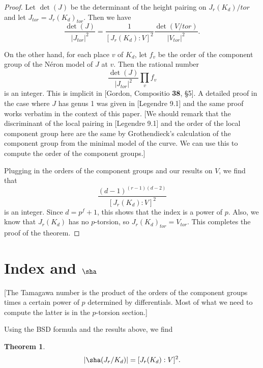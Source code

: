 \documentclass[reqno]{amsart}
\newtheorem{thm}{Theorem}[section]
\theoremstyle{definition}
\theoremstyle{remark}
\begin{document}
\begin{proof}
Let $\det(J)$ be the determinant of the height pairing on
$J_r(K_d)/tor$ and let $J_{tor}=J_r(K_d)_{tor}$.  Then we have
$$\frac{\det(J)}{|J_{tor}|^2}=\frac1{[J_r(K_d):V]^{2}}\frac{\det(V/tor)}{|V_{tor}|^2}.$$

On the other hand, for each place $v$ of $K_d$, let $f_v$ be the order
of the component group of the N\'eron model of $J$ at $v$.  Then the
rational number
$$\frac{\det(J)}{|J_{tor}|^2}\prod_v f_v$$
is an integer.  This is implicit in [Gordon, Compositio {\bf 38},
\S5].  A detailed proof in the case where $J$ has genus 1 was given in
[Legendre 9.1] and the same proof works verbatim in the context of
this paper.  [We should remark that the discriminant of the local
pairing in [Legendre 9.1] and the order of the local component group
here are the same by Grothendieck's calculation of the component group
from the minimal model of the curve.  We can use this to compute the
order of the component groups.]

Plugging in the orders of the component groups and our results on $V$,
we find that 
$$\frac{(d-1)^{(r-1)(d-2)}}{[J_r(K_d):V]^2}$$
is an integer.  Since $d=p^f+1$, this shows that the index is a power
of $p$.  Also, we know that $J_r(K_d)$ has no $p$-torsion, so
$J_r(K_d)_{tor}=V_{tor}$.  This completes the proof of the theorem.
\end{proof}

\section{Index and $\sha$}

[The Tamagawa number is the product of the orders of the component
groups times a certain power of $p$ determined by differentials.  Most
of what we need to compute the latter is in the $p$-torsion section.]

Using the BSD formula and the results above, we find
\begin{thm}
$$|\sha(J_r/K_d)|=[J_r(K_d):V]^2.$$
\end{thm}
\end{document}
